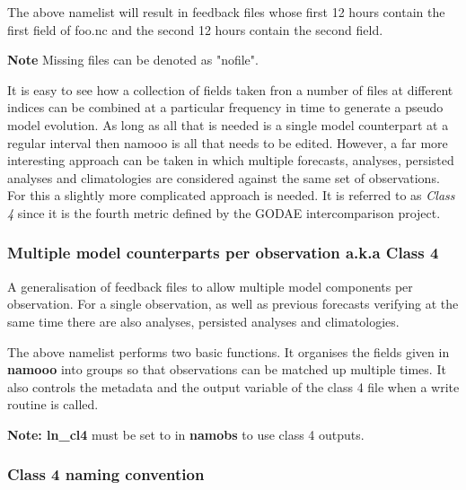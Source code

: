 \documentclass[../tex_main/NEMO_manual]{subfiles}
\begin{document}
The above namelist will result in feedback files whose first 12 hours contain the first field of foo.nc and
the second 12 hours contain the second field.

\textbf{Note} Missing files can be denoted as "nofile".

It is easy to see how a collection of fields taken fron a number of files at different indices can be combined at
a particular frequency in time to generate a pseudo model evolution.
As long as all that is needed is a single model counterpart at a regular interval then
namooo is all that needs to be edited.
However, a far more interesting approach can be taken in which multiple forecasts, analyses, persisted analyses and
climatologies are considered against the same set of observations.
For this a slightly more complicated approach is needed.
It is referred to as \emph{Class 4} since it is the fourth metric defined by the GODAE intercomparison project.

\subsubsection{Multiple model counterparts per observation a.k.a Class 4}

A generalisation of feedback files to allow multiple model components per observation.
For a single observation, as well as previous forecasts verifying at the same time
there are also analyses, persisted analyses and climatologies. 


The above namelist performs two basic functions.
It organises the fields given in \textbf{namooo} into groups so that observations can be matched up multiple times.
It also controls the metadata and the output variable of the class 4 file when a write routine is called.

\textbf{Note: ln\_cl4} must be set to  in \textbf{namobs} to use class 4 outputs.

\subsubsection{Class 4 naming convention}
\end{document}
